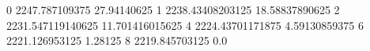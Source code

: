0 2247.787109375 27.94140625
1 2238.43408203125 18.58837890625
2 2231.547119140625 11.701416015625
4 2224.43701171875 4.59130859375
6 2221.126953125 1.28125
8 2219.845703125 0.0
